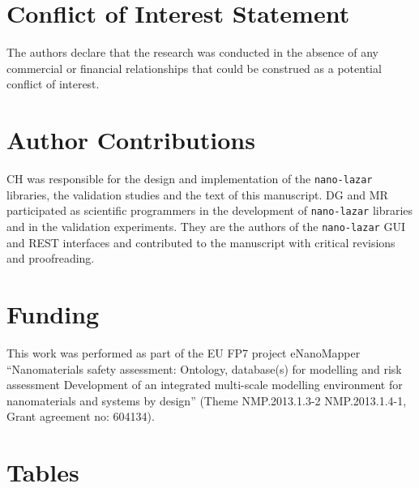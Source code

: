 \documentclass[utf8]{frontiersHLTH} %
\begin{document}
\section{Conflict of Interest
Statement}\label{conflict-of-interest-statement}

The authors declare that the research was conducted in the absence of
any commercial or financial relationships that could be construed as a
potential conflict of interest.

\section{Author Contributions}\label{author-contributions}

CH was responsible for the design and implementation of the
\texttt{nano-lazar} libraries, the validation studies and the text of
this manuscript. DG and MR participated as scientific programmers in the
development of \texttt{nano-lazar} libraries and in the validation
experiments. They are the authors of the \texttt{nano-lazar} GUI and
REST interfaces and contributed to the manuscript with critical
revisions and proofreading.

\section{Funding}\label{funding}

This work was performed as part of the EU FP7 project eNanoMapper
``Nanomaterials safety assessment: Ontology, database(s) for modelling
and risk assessment Development of an integrated multi-scale modelling
environment for nanomaterials and systems by design'' (Theme
NMP.2013.1.3-2 NMP.2013.1.4-1, Grant agreement no: 604134).

\section{Tables}\label{tables}
\end{document}
